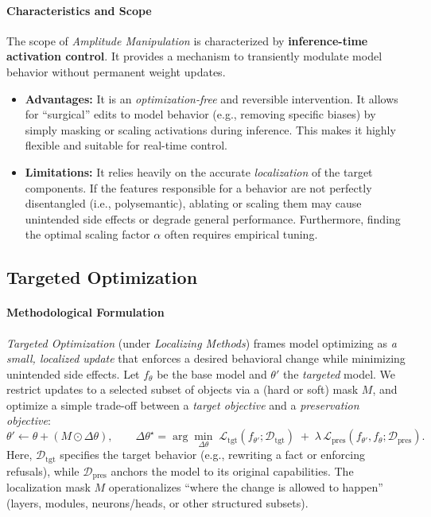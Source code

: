\documentclass[11pt,letterpaper]{mystyle}
\begin{document}
\paragraph{Characteristics and Scope}
The scope of \textit{Amplitude Manipulation} is characterized by \textbf{inference-time activation control}. It provides a mechanism to transiently modulate model behavior without permanent weight updates.
\begin{itemize}[leftmargin=*]
    \item \textbf{Advantages:} It is an \textit{optimization-free} and reversible intervention. It allows for ``surgical'' edits to model behavior (e.g., removing specific biases) by simply masking or scaling activations during inference. This makes it highly flexible and suitable for real-time control.
    \item \textbf{Limitations:} It relies heavily on the accurate \textit{localization} of the target components. If the features responsible for a behavior are not perfectly disentangled (i.e., polysemantic), ablating or scaling them may cause unintended side effects or degrade general performance. Furthermore, finding the optimal scaling factor $\alpha$ often requires empirical tuning.
\end{itemize}



\subsection{Targeted Optimization}
\label{sec:target_optimization}



\paragraph{Methodological Formulation}
\textit{Targeted Optimization} (under \textit{Localizing Methods}) frames model optimizing as \emph{a small, localized update} that enforces a desired behavioral change while minimizing unintended side effects.
Let $f_\theta$ be the base model and $\theta'$ the \emph{targeted} model. We restrict updates to a selected subset of objects via a (hard or soft) mask $M$, and optimize a simple trade-off between a \emph{target objective} and a \emph{preservation objective}:
\begin{equation}
\theta' \leftarrow \theta + (M \odot \Delta\theta),\qquad
\Delta\theta^\star = \arg\min_{\Delta\theta}\;\mathcal{L}_{\text{tgt}}(f_{\theta'};\mathcal{D}_{\text{tgt}})\;+\;\lambda\,\mathcal{L}_{\text{pres}}(f_{\theta'},f_{\theta};\mathcal{D}_{\text{pres}}).
\label{eq:targetopt_simple}
\end{equation}
Here, $\mathcal{D}_{\text{tgt}}$ specifies the target behavior (e.g., rewriting a fact or enforcing refusals), while $\mathcal{D}_{\text{pres}}$ anchors the model to its original capabilities. The localization mask $M$ operationalizes ``where the change is allowed to happen'' (layers, modules, neurons/heads, or other structured subsets).
\end{document}
